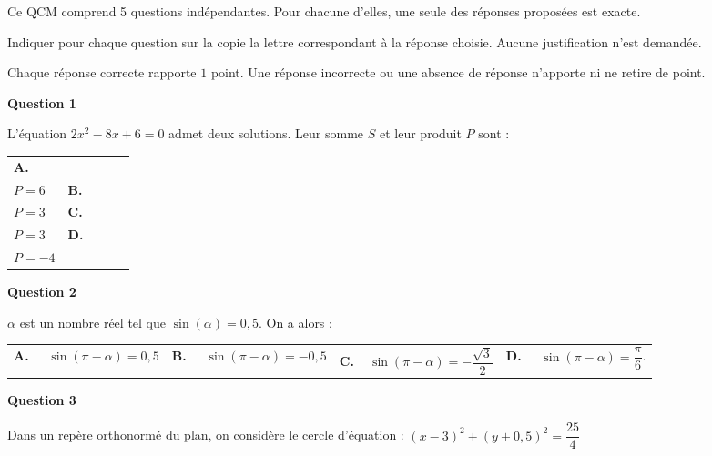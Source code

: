 \medskip

Ce QCM comprend 5 questions indépendantes. Pour chacune d'elles, une seule des réponses
proposées est exacte.

Indiquer pour chaque question sur la copie la lettre correspondant à la réponse choisie.
Aucune justification n'est demandée.

Chaque réponse correcte rapporte $1$ point. Une réponse incorrecte ou une absence de
réponse n'apporte ni ne retire de point.

\medskip
\textbf{Question 1}
\medskip 


L'équation $2x^2 - 8x + 6 = 0 $ admet deux solutions. Leur somme $S$ et leur produit $P$ sont :

\medskip

\begin{tabularx}{\linewidth}{*{4}{X}}
\textbf{A.~~} \begin{minipage}[t]{2cm}
$S = -8$\\
$P = 6$\end{minipage} &\textbf{B.~~} \begin{minipage}[t]{2cm}$S= -4$\\$P = 3$\end{minipage}&\textbf{C.~~}\begin{minipage}[t]{2cm}$S = 4$\\$P = 3$\end{minipage}& \textbf{D.~~} \begin{minipage}[t]{2cm}$S = 3$\\$P =-4$\end{minipage}.
\end{tabularx}

\medskip

\textbf{Question 2}

\medskip 

$\alpha$ est un nombre réel tel que $\sin(\alpha) = 0,5$. On a alors :

\medskip

\begin{tabularx}{\linewidth}{*{4}{X}}
\textbf{A.~~} $\sin(\pi-\alpha) = 0,5$ &\textbf{B.~~} $\sin(\pi-\alpha) = -0,5$&\textbf{C.~~}$\sin(\pi-\alpha) = -\dfrac{\sqrt{3}}{2}$& \textbf{D.~~} $\sin(\pi-\alpha) =\dfrac{\pi}{6}$.
\end{tabularx}

\medskip

\textbf{Question 3}

\medskip 

Dans un repère orthonormé du plan, on considère le cercle d'équation :
$(x-3)^2 + (y+ 0,5)^2 = \dfrac{25}{4}$

